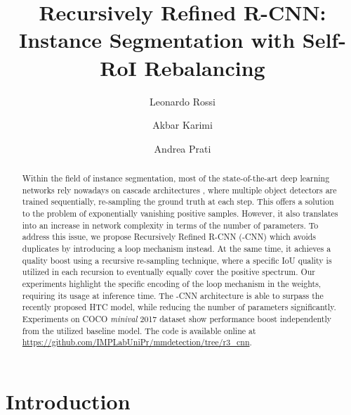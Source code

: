 \documentclass[runningheads, orivec]{llncs}
\begin{document}
\title{Recursively Refined R-CNN: \\Instance Segmentation with Self-RoI Rebalancing}
\author{Leonardo Rossi \and
Akbar Karimi \and
Andrea Prati}
\maketitle              \begin{abstract}
Within the field of instance segmentation, most of the state-of-the-art deep learning networks rely nowadays on cascade architectures \cite{Cai_2018_CVPR}, where multiple object detectors are trained sequentially, re-sampling the ground truth at each step.
This offers a solution to the problem of exponentially vanishing positive samples.
However, it also translates into an increase in network complexity in terms of the number of parameters.
To address this issue, we propose Recursively Refined R-CNN (-CNN) which avoids duplicates by introducing a loop mechanism instead. At the same time, it achieves a quality boost using a recursive re-sampling technique, where a specific IoU quality is utilized in each recursion to eventually equally cover the positive spectrum.
Our experiments highlight the specific encoding of the loop mechanism in the weights, requiring its usage at inference time.
The -CNN architecture is able to surpass the recently proposed HTC \cite{chen2019hybrid} model, while reducing the number of parameters significantly.
Experiments on COCO \textit{minival} 2017 dataset show performance boost independently from the utilized baseline model.
The code is available online at \url{https://github.com/IMPLabUniPr/mmdetection/tree/r3_cnn}.

\end{abstract} 


\section{Introduction}
\label{sec:introduction}
\end{document}
